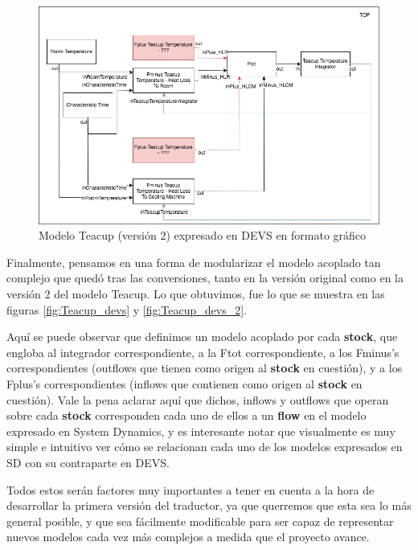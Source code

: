 \begin{figure}[!h]
\centering
\includegraphics[scale=0.4]{imagenes/Teacup_devs_flattened_2}
\caption{Modelo Teacup (versión 2) expresado en DEVS en formato gráfico}
\label{fig:Teacup_devs_flattened_2}
\end{figure}

Finalmente, pensamos en una forma de modularizar el modelo acoplado tan complejo que quedó tras las conversiones, tanto en la versión original como en la versión 2 del modelo Teacup. Lo que obtuvimos, fue lo que se muestra en las figuras \ref{fig:Teacup_devs} y \ref{fig:Teacup_devs_2}.

Aquí se puede observar que definimos un modelo acoplado por cada \textbf{stock}, que engloba al integrador correspondiente, a la Ftot correspondiente, a los Fminus's correspondientes (outflows que tienen como origen al \textbf{stock} en cuestión), y a los Fplus's correspondientes (inflows que contienen como origen al \textbf{stock} en cuestión). Vale la pena aclarar aquí que dichos, inflows y outflows que operan sobre cada \textbf{stock} corresponden cada uno de ellos a un \textbf{flow} en el modelo expresado en System Dynamics, y es interesante notar que visualmente es muy simple e intuitivo ver cómo se relacionan cada uno de los modelos expresados en SD con su contraparte en DEVS. 

Todos estos serán factores muy importantes a tener en cuenta a la hora de desarrollar la primera versión del traductor, ya que querremos que esta sea lo más general posible, y que sea fácilmente modificable para ser capaz de representar nuevos modelos cada vez más complejos a medida que el proyecto avance.

